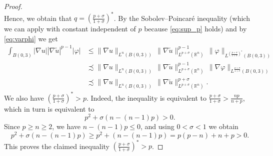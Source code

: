 \documentclass[12pt]{amsart}
\newcommand{\R}{\mathbb{R}}
\newcommand{\abs}[1]{\left |#1 \right |}
\numberwithin{theorem}{section} \numberwithin{equation}{section}
\newcommand{\aleq}{\precsim}
\begin{document}
\begin{proof}
\[\]
Hence, we obtain that $q = \left( \frac{p+\sigma}{1+\sigma}\right)^*$.
By the Sobolev--Poincar\'{e} inequality (which we can apply with constant independent of $p$ because \eqref{eq:sup_p} holds) and by \eqref{eq:varphi} we get
\begin{equation}\label{eq:number2}
\begin{split} 
	\int_{B(0,3)} |\nabla u| |\nabla \tilde{u}|^{p-1} \abs{\varphi} & \leq \|\nabla u \|_{L^n(B(0,3))}\, \|\nabla \tilde{u} \|_{L^{p+\sigma}(\R^n)}^{p-1} \, \|\varphi\|_{L^{\left( \frac{p+\sigma}{1+\sigma}\right)^* }(B(0,3))} \\
	 & \aleq \|\nabla u \|_{L^n(B(0,3))}\, \|\nabla \tilde{u} \|_{L^{p+\sigma}(\R^n)}^{p-1} \, \|\nabla \varphi\|_{L^{ \frac{p+\sigma}{1+\sigma} }(B(0,3))} \\
	 & \aleq \|\nabla u \|_{L^n(B(0,3))}\, \|\nabla \tilde{u} \|_{L^{p+\sigma}(\R^n)}^{p+\sigma}.
\end{split} 
\end{equation}
We also have $\left(\frac{p+\sigma}{1+\sigma}\right)^*>p$. Indeed,
the inequality is equivalent to $\frac{p+\sigma}{1+\sigma}>\frac{np}{n+p}$, which in turn is equivalent to 
\[
p^2+\sigma(n-(n-1)p)>0.
\]
Since $p\ge n\ge 2$, we have $n-(n-1)p\le 0$, and using $0<\sigma<1$ we obtain
\[
p^2+\sigma(n-(n-1)p)
\ge p^2+(n-(n-1)p)
= p(p-n)+n+p
>0.
\]
This proves the claimed inequality $\left(\frac{p+\sigma}{1+\sigma}\right)^*>p$.




\end{proof}
\end{document}
